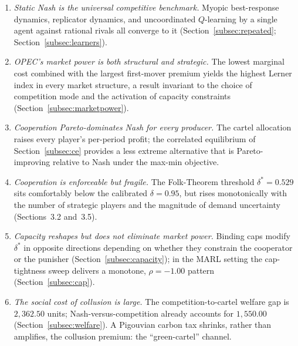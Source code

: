 \begin{enumerate}\itemsep2pt

  \item \emph{Static Nash is the universal competitive
        benchmark.} Myopic best-response dynamics, replicator
        dynamics, and uncoordinated $Q$-learning by a single
        agent against rational rivals all converge to it
        (Section~\ref{subsec:repeated}; Section~\ref{subsec:learners}).

  \item \emph{OPEC's market power is both structural and
        strategic.} The lowest marginal cost combined with the
        largest first-mover premium yields the highest Lerner
        index in every market structure, a result invariant to
        the choice of competition mode and the activation of
        capacity constraints (Section~\ref{subsec:marketpower}).

  \item \emph{Cooperation Pareto-dominates Nash for every
        producer.} The cartel allocation raises every player's
        per-period profit; the correlated equilibrium of
        Section~\ref{subsec:ce} provides a less extreme alternative that is
        Pareto-improving relative to Nash under the max-min
        objective.

  \item \emph{Cooperation is enforceable but fragile.} The
        Folk-Theorem threshold $\delta^\ast = 0.529$ sits
        comfortably below the calibrated $\delta = 0.95$, but
        rises monotonically with the number of strategic players
        and the magnitude of demand uncertainty (Sections~3.2
        and~3.5).

  \item \emph{Capacity reshapes but does not eliminate market
        power.} Binding caps modify $\delta^\ast$ in opposite
        directions depending on whether they constrain the
        cooperator or the punisher (Section~\ref{subsec:capacity}); in the MARL
        setting the cap-tightness sweep delivers a monotone,
        $\rho = -1.00$ pattern
        (Section~\ref{subsec:cap}).

  \item \emph{The social cost of collusion is large.} The
        competition-to-cartel welfare gap is $2{,}362.50$
        units; Nash-versus-competition already accounts for
        $1{,}550.00$ (Section~\ref{subsec:welfare}). A Pigouvian carbon tax
        shrinks, rather than amplifies, the collusion
        premium: the ``green-cartel'' channel.


\end{enumerate}
